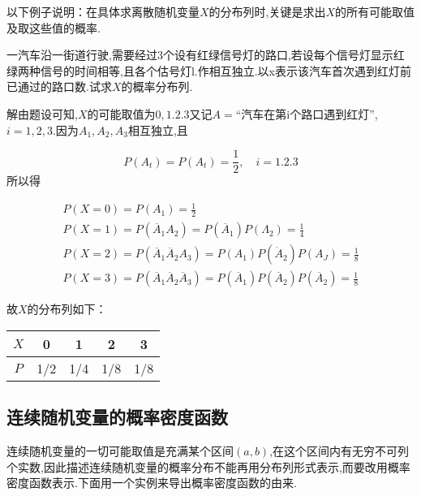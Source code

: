 以下例子说明：在具体求离散随机变量$ X $的分布列时,关键是求出$ X $的所有可能取值及取这些值的概率.

\begin{example}
	一汽车沿一街道行驶,需要经过3个设有红绿信号灯的路口,若设每个信号灯显示红绿两种信号的时间相等,且各个估号灯l.作相互独立.以x表示该汽车首次遇到红灯前已通过的路口数.试求$ X $的概率分布列.
	
	解由题设可知,$ X $的可能取值为$ 0,1.2.3 $又记$ A= $“汽车在第i个路口遇到红灯”,$ i=1,2,3 $.因为$ A_1,A_2,A_3 $相互独立,且
	
	\[ 
	P\left(A_{t}\right)=P\left(A_{t}\right)=\frac{1}{2}, \quad i=1.2 .3
	\]
	所以得
	
	\[ 
	\begin{array}{l}
	{P(X=0)=P\left(A_{1}\right)=\frac{1}{2}} \\ 
	{P(X=1)=P\left(\overline{A}_{1} A_{2}\right)=P\left(\overline{A}_{1}\right) P\left(\Lambda_{2}\right)=\frac{1}{4}} \\ 
	{P(X=2)=P\left(\overline{A}_{1} \overline{A}_{2} A_{3}\right)=P\left(A_{1}\right) P\left(\dot{A}_{2}\right) P\left(A_{J}\right)=\frac{1}{8}}\\
	{P(X=3)=P\left(\overline{A}_{1} \overline{A}_{2} \overline{A}_{3}\right)=P\left(\overline{A}_{1}\right) P\left(\overline{A}_{2}\right) P\left(\overline{A}_{2}\right)=\frac{1}{8}}
	\end{array}
	\]
	
	故$ X $的分布列如下：
	
	\begin{table}[htbp]
		\centering
		\begin{tabular}{c|cccc}
			$ X $     & 0     & 1     & 2     & 3 \\\hline
			$ P $     & 1/2   & 1/4   & 1/8   & 1/8 \\
		\end{tabular}%
	\end{table}%
	
\end{example}

\subsection{连续随机变量的概率密度函数}

连续随机变量的一切可能取值是充满某个区间$ (a,b) $,在这个区间内有无穷不可列个实数,因此描述连续随机变量的概率分布不能再用分布列形式表示,而要改用概率密度函数表示.下面用一个实例来导出概率密度函数的由来.

